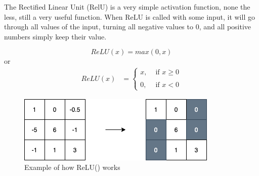 The Rectified Linear Unit (RelU) is a very simple activation function, none the less, still a very useful function. When ReLU is called with some input, it will go through all values of the input, turning all negative values to 0, and all positive numbers simply keep their value.

$$
ReLU(x) = max(0,x)
$$
or
\begin{align}
  ReLU(x) &=\left\{
  \begin{matrix}
    x, & \text{ if } x \geq 0\\
    \\
    0,  &\text{ if } x < 0
  \end{matrix}
  \right.
\end{align}

\begin{figure}[!ht]
  \centering
  \includegraphics[scale=0.4]{latex/imgs/relu.png}
  \caption{Example of how ReLU() works}\label{Baseline:before}
\end{figure}
